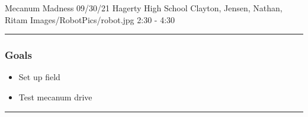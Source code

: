 \insertmeeting 
	{Mecanum Madness} 
	{09/30/21}
	{Hagerty High School}
	{Clayton, Jensen, Nathan, Ritam}
	{Images/RobotPics/robot.jpg}
	{2:30 - 4:30}
	
\noindent\hfil\rule{\textwidth}{.4pt}\hfil
\subsubsection*{Goals}
\begin{itemize}
    \item Set up field
    \item Test mecanum drive
 

\end{itemize} 

\noindent\hfil\rule{\textwidth}{.4pt}\hfil

